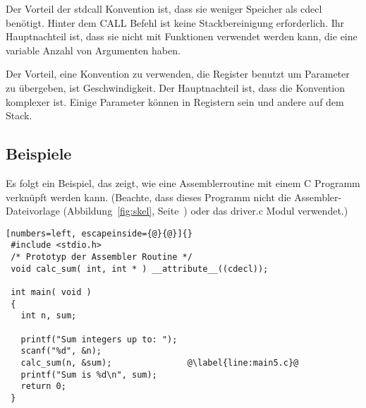 Der Vorteil der {\code stdcall}  Konvention ist, dass sie weniger Speicher als {\code cdecl}
ben\"{o}tigt. Hinter dem {\code CALL} Befehl ist keine Stackbereinigung
erforderlich. Ihr Hauptnachteil ist, dass sie nicht mit Funktionen
verwendet werden kann, die eine variable Anzahl von Argumenten
haben.

Der Vorteil, eine Konvention zu verwenden, die Register benutzt um
Parameter zu \"{u}bergeben, ist Geschwindigkeit. Der Hauptnachteil ist,
dass die Konvention komplexer ist. Einige Parameter k\"{o}nnen in
Registern sein und andere auf dem Stack.


\subsection{Beispiele}

Es folgt ein Beispiel, das zeigt, wie eine Assemblerroutine mit
einem C Programm verkn\"{u}pft werden kann. (Beachte, dass dieses
Programm nicht die As\-semb\-ler-Da\-tei\-vor\-lage
(Abbildung~\ref{fig:skel}, Seite~\pageref{fig:skel}) oder das
driver.c Modul verwendet.)

\begin{lstlisting}[numbers=left, escapeinside={@}{@}]{}
 #include <stdio.h>
 /* Prototyp der Assembler Routine */
 void calc_sum( int, int * ) __attribute__((cdecl));

 int main( void )
 {
   int n, sum;

   printf("Sum integers up to: ");
   scanf("%d", &n);
   calc_sum(n, &sum);               @\label{line:main5.c}@
   printf("Sum is %d\n", sum);
   return 0;
 }
\end{lstlisting}

